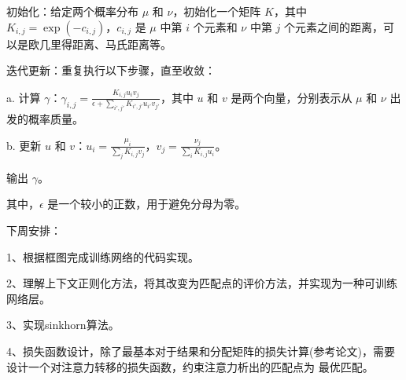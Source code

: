 \documentclass[10pt,a4paper]{article}
\begin{document}
初始化：给定两个概率分布 $\mu$ 和 $\nu$，初始化一个矩阵 $K$，其中 $K_{i,j} = \exp(-c_{i,j})$，$c_{i,j}$ 是 $\mu$ 中第
$i$ 个元素和 $\nu$ 中第 $j$ 个元素之间的距离，可以是欧几里得距离、马氏距离等。

迭代更新：重复执行以下步骤，直至收敛：

\qquad a. 计算 $\gamma$：$\gamma_{i,j}=\frac{K_{i,j}u_i v_j}{\epsilon+\sum_{i',j'}K_{i',j'}u_{i'}v_{j'}}$，其中 $u$ 和
 $v$ 是两个向量，分别表示从 $\mu$ 和 $\nu$ 出发的概率质量。

\qquad b. 更新 $u$ 和 $v$：$u_i=\frac{\mu_i}{\sum_j K_{i,j}v_j}$，$v_j=\frac{\nu_j}{\sum_i K_{i,j}u_i}$。

输出 $\gamma$。

其中，$\epsilon$ 是一个较小的正数，用于避免分母为零。

下周安排：

1、根据框图完成训练网络的代码实现。

2、理解上下文正则化方法，将其改变为匹配点的评价方法，并实现为一种可训练网络层。

3、实现sinkhorn算法。

4、损失函数设计，除了最基本对于结果和分配矩阵的损失计算(参考论文)，需要设计一个对注意力转移的损失函数，约束注意力析出的匹配点为
最优匹配。
\end{document}
